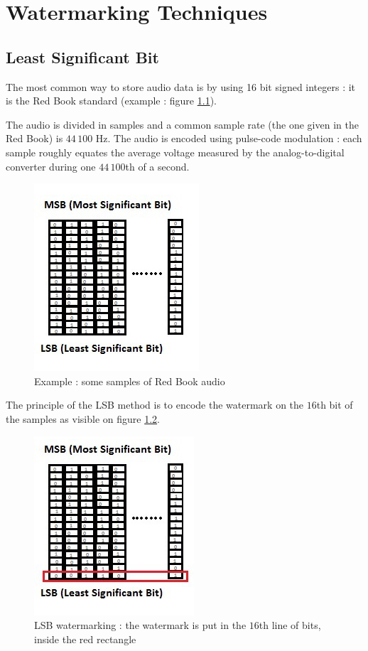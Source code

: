 \chapter{Watermarking Techniques}
\section{Least Significant Bit}
The most common way to store audio data is by using 16 bit signed integers : it is the Red Book standard (example : figure \ref{fig:audio}).

The audio is divided in samples and a common sample rate (the one given in the Red Book) is $44\,100$ Hz. The audio is encoded using pulse-code modulation : each sample roughly equates the average voltage measured by the analog-to-digital converter during one $44\,100$th of a second.

\begin{figure}[h!]
\centering
\includegraphics{images/LSB1.jpg}
\caption{Example : some samples of Red Book audio}
\label{fig:audio}
\end{figure}


The principle of the \ac{LSB} method \cite{tirkel1993electronic} is to encode the watermark on the $16$th bit of the samples as visible on figure \ref{fig:lsb}.

\begin{figure}[h!]
\centering
\includegraphics{images/LSB2.jpg}
\caption{LSB watermarking : the watermark is put in the $16$th line of bits, inside the red rectangle}
\label{fig:lsb}
\end{figure}

